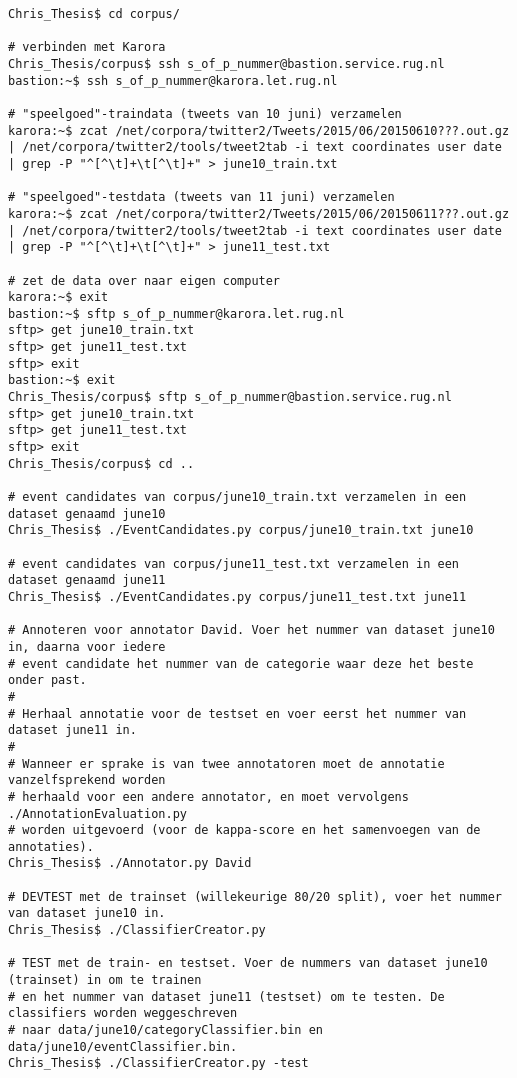 {{\begin{lstlisting}
Chris_Thesis$ cd corpus/

# verbinden met Karora
Chris_Thesis/corpus$ ssh s_of_p_nummer@bastion.service.rug.nl
bastion:~$ ssh s_of_p_nummer@karora.let.rug.nl

# "speelgoed"-traindata (tweets van 10 juni) verzamelen
karora:~$ zcat /net/corpora/twitter2/Tweets/2015/06/20150610???.out.gz | /net/corpora/twitter2/tools/tweet2tab -i text coordinates user date | grep -P "^[^\t]+\t[^\t]+" > june10_train.txt

# "speelgoed"-testdata (tweets van 11 juni) verzamelen
karora:~$ zcat /net/corpora/twitter2/Tweets/2015/06/20150611???.out.gz | /net/corpora/twitter2/tools/tweet2tab -i text coordinates user date | grep -P "^[^\t]+\t[^\t]+" > june11_test.txt

# zet de data over naar eigen computer
karora:~$ exit
bastion:~$ sftp s_of_p_nummer@karora.let.rug.nl
sftp> get june10_train.txt 
sftp> get june11_test.txt
sftp> exit
bastion:~$ exit
Chris_Thesis/corpus$ sftp s_of_p_nummer@bastion.service.rug.nl
sftp> get june10_train.txt 
sftp> get june11_test.txt
sftp> exit
Chris_Thesis/corpus$ cd ..

# event candidates van corpus/june10_train.txt verzamelen in een dataset genaamd june10
Chris_Thesis$ ./EventCandidates.py corpus/june10_train.txt june10

# event candidates van corpus/june11_test.txt verzamelen in een dataset genaamd june11
Chris_Thesis$ ./EventCandidates.py corpus/june11_test.txt june11

# Annoteren voor annotator David. Voer het nummer van dataset june10 in, daarna voor iedere 
# event candidate het nummer van de categorie waar deze het beste onder past. 
#
# Herhaal annotatie voor de testset en voer eerst het nummer van dataset june11 in. 
#
# Wanneer er sprake is van twee annotatoren moet de annotatie vanzelfsprekend worden 
# herhaald voor een andere annotator, en moet vervolgens ./AnnotationEvaluation.py 
# worden uitgevoerd (voor de kappa-score en het samenvoegen van de annotaties).
Chris_Thesis$ ./Annotator.py David

# DEVTEST met de trainset (willekeurige 80/20 split), voer het nummer van dataset june10 in.
Chris_Thesis$ ./ClassifierCreator.py

# TEST met de train- en testset. Voer de nummers van dataset june10 (trainset) in om te trainen
# en het nummer van dataset june11 (testset) om te testen. De classifiers worden weggeschreven 
# naar data/june10/categoryClassifier.bin en data/june10/eventClassifier.bin.
Chris_Thesis$ ./ClassifierCreator.py -test


\end{lstlisting}}}
